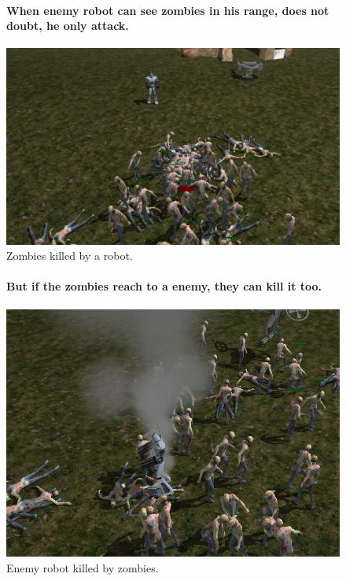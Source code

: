 \documentclass[a4paper,10pt]{article}
\newcommand{\p}[1]{\paragraph{\indent\textnormal{#1}}}
\begin{document}
	\begin{figure}[hbt]	
	\p{When enemy robot can see zombies in his range, does not doubt, he only attack. \newline}
    
	    \begin{center}
			\includegraphics[scale=.6]{captura2.png}
	    \end{center}
	    \caption{Zombies killed by a robot.}
	\end{figure}

	\begin{figure}[hbt]
	
	\p{But if the zombies reach to a enemy, they can kill it too. \newline}    
	    \begin{center}
			\includegraphics[scale=.7]{captura3.png}
	    \end{center}
	    \caption{Enemy robot killed by zombies.}
	\end{figure}
\end{document}
